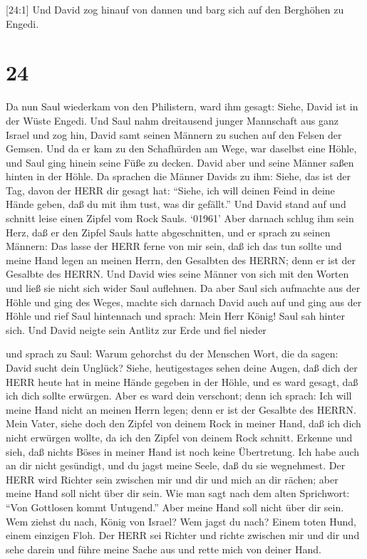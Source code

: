  {[}24:1{]} Und David zog hinauf von dannen und barg sich
auf den Berghöhen zu Engedi.

\hypertarget{section-23}{%
\section{24}\label{section-23}}

 Da nun Saul wiederkam von den Philistern, ward ihm gesagt:
Siehe, David ist in der Wüste Engedi.  Und Saul nahm
dreitausend junger Mannschaft aus ganz Israel und zog hin, David samt
seinen Männern zu suchen auf den Felsen der Gemsen.  Und da
er kam zu den Schafhürden am Wege, war daselbst eine Höhle, und Saul
ging hinein seine Füße zu decken. David aber und seine Männer saßen
hinten in der Höhle.  Da sprachen die Männer Davids zu ihm:
Siehe, das ist der Tag, davon der HERR dir gesagt hat: ``Siehe, ich will
deinen Feind in deine Hände geben, daß du mit ihm tust, was dir
gefällt.'' Und David stand auf und schnitt leise einen Zipfel vom Rock
Sauls.  `01961' Aber darnach schlug ihm sein Herz, daß er
den Zipfel Sauls hatte abgeschnitten,  und er sprach zu
seinen Männern: Das lasse der HERR ferne von mir sein, daß ich das tun
sollte und meine Hand legen an meinen Herrn, den Gesalbten des HERRN;
denn er ist der Gesalbte des HERRN.  Und David wies seine
Männer von sich mit den Worten und ließ sie nicht sich wider Saul
auflehnen. Da aber Saul sich aufmachte aus der Höhle und ging des Weges,
 machte sich darnach David auch auf und ging aus der Höhle
und rief Saul hintennach und sprach: Mein Herr König! Saul sah hinter
sich. Und David neigte sein Antlitz zur Erde und fiel nieder

 und sprach zu Saul: Warum gehorchst du der Menschen Wort,
die da sagen: David sucht dein Unglück?  Siehe,
heutigestages sehen deine Augen, daß dich der HERR heute hat in meine
Hände gegeben in der Höhle, und es ward gesagt, daß ich dich sollte
erwürgen. Aber es ward dein verschont; denn ich sprach: Ich will meine
Hand nicht an meinen Herrn legen; denn er ist der Gesalbte des HERRN.
 Mein Vater, siehe doch den Zipfel von deinem Rock in
meiner Hand, daß ich dich nicht erwürgen wollte, da ich den Zipfel von
deinem Rock schnitt. Erkenne und sieh, daß nichts Böses in meiner Hand
ist noch keine Übertretung. Ich habe auch an dir nicht gesündigt, und du
jagst meine Seele, daß du sie wegnehmest.  Der HERR wird
Richter sein zwischen mir und dir und mich an dir rächen; aber meine
Hand soll nicht über dir sein.  Wie man sagt nach dem alten
Sprichwort: ``Von Gottlosen kommt Untugend.'' Aber meine Hand soll nicht
über dir sein.  Wem ziehst du nach, König von Israel? Wem
jagst du nach? Einem toten Hund, einem einzigen Floh.  Der
HERR sei Richter und richte zwischen mir und dir und sehe darein und
führe meine Sache aus und rette mich von deiner Hand.

